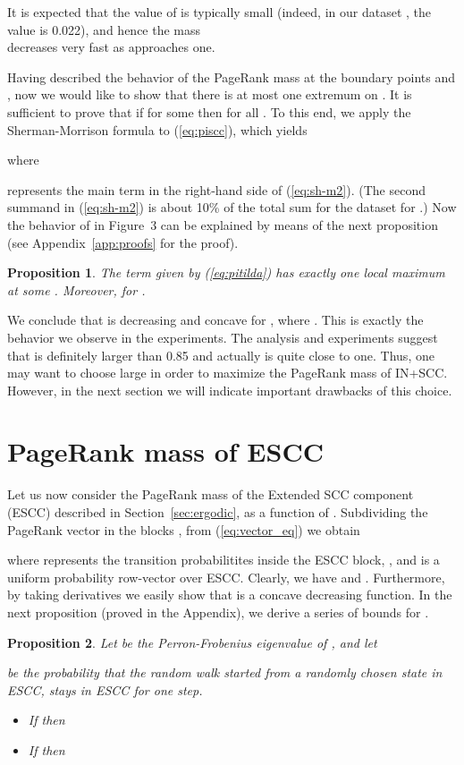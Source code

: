\documentclass{article}
\newtheorem{proposition}{Proposition}
\begin{document}
It is expected that the value of  is typically
small (indeed, in our dataset , the value is 0.022), and
hence the mass\\   decreases very fast as 
approaches one.

Having described the behavior of the PageRank mass 
at the boundary points  and , now we would like to show
that there is at most one extremum on . It is sufficient to
prove that if  for some  then
 for all . To this end, we apply the
Sherman-Morrison formula to (\ref{eq:piscc}), which yields

where

represents the main term in the right-hand side of (\ref{eq:sh-m2}).
(The second summand in (\ref{eq:sh-m2}) is about 10\% of the total
sum for the  dataset for .) Now the behavior of
 in Figure~3 can be explained by means of the next
proposition (see Appendix~\ref{app:proofs} for the proof).
\begin{proposition}
\label{prop:pitilda} The term  given by
(\ref{eq:pitilda}) has exactly one local maximum at some . Moreover,  for .
\end{proposition}
We conclude that
  is decreasing and concave
for , where . This is exactly the behavior we observe in the
experiments. The analysis and experiments suggest that  is definitely larger than 0.85 and actually is quite close to one. Thus, one may want to choose large  in order to maximize the PageRank mass of IN+SCC. However, in the next section we will indicate important drawbacks of this choice.


\section{PageRank mass of ESCC}
\label{sec:bounds}

Let us now consider the PageRank mass of the Extended SCC component
(ESCC) described in Section~\ref{sec:ergodic}, as a function of . Subdividing the PageRank vector in the blocks
, from (\ref{eq:vector_eq}) we
obtain

where  represents the transition probabilitites inside the ESCC
block, , and  is a uniform probability
row-vector over ESCC. Clearly, we have  and
. Furthermore, by taking derivatives we easily
show that  is a concave decreasing function. In
the next proposition (proved in the Appendix), we derive a series of
bounds for .


\begin{proposition}
\label{prop:bounds}
Let  be the Perron-Frobenius eigenvalue of , and let

be the probability that the random walk started from a randomly chosen state in ESCC, stays in ESCC for one step.
\begin{itemize}
\item[(i)]
If  then
 \item[(ii)] If
 then

\end{itemize}
\end{proposition}
\end{document}
